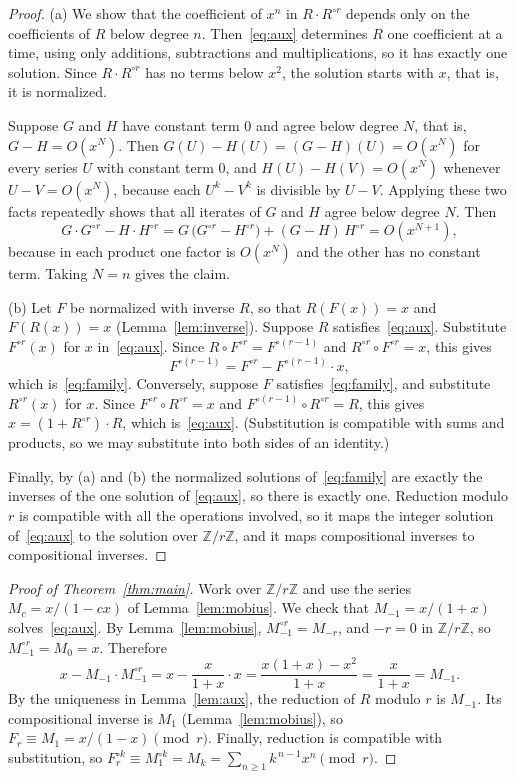 \documentclass[11pt,a4paper]{article}
\theoremstyle{definition}
\theoremstyle{remark}
\newcommand{\Z}{\mathbb{Z}}
\begin{document}
\begin{proof}
(a) We show that the coefficient of $x^n$ in $R\cdot R^{\circ r}$ depends only on the coefficients of $R$ below degree
$n$. Then~\eqref{eq:aux} determines $R$ one coefficient at a time, using only additions, subtractions and
multiplications, so it has exactly one solution. Since $R\cdot R^{\circ r}$ has no terms below $x^2$, the solution
starts with $x$, that is, it is normalized.

Suppose $G$ and $H$ have constant term $0$ and agree below degree $N$, that is, $G-H=O(x^N)$. Then
$G(U)-H(U)=(G-H)(U)=O(x^N)$ for every series $U$ with constant term $0$, and $H(U)-H(V)=O(x^N)$ whenever
$U-V=O(x^N)$, because each $U^k-V^k$ is divisible by $U-V$. Applying these two facts repeatedly shows that all
iterates of $G$ and $H$ agree below degree $N$. Then
\[
G\cdot G^{\circ r}-H\cdot H^{\circ r}=G\,\bigl(G^{\circ r}-H^{\circ r}\bigr)+(G-H)\,H^{\circ r}=O(x^{N+1}),
\]
because in each product one factor is $O(x^N)$ and the other has no constant term. Taking $N=n$ gives the claim.

(b) Let $F$ be normalized with inverse $R$, so that $R(F(x))=x$ and $F(R(x))=x$ (Lemma~\ref{lem:inverse}). Suppose $R$
satisfies~\eqref{eq:aux}. Substitute $F^{\circ r}(x)$ for $x$ in~\eqref{eq:aux}. Since $R\circ F^{\circ r}=F^{\circ(r-1)}$
and $R^{\circ r}\circ F^{\circ r}=x$, this gives
\[
F^{\circ(r-1)}=F^{\circ r}-F^{\circ(r-1)}\cdot x,
\]
which is~\eqref{eq:family}. Conversely, suppose $F$ satisfies~\eqref{eq:family}, and substitute $R^{\circ r}(x)$ for $x$.
Since $F^{\circ r}\circ R^{\circ r}=x$ and $F^{\circ(r-1)}\circ R^{\circ r}=R$, this gives $x=(1+R^{\circ r})\cdot R$,
which is~\eqref{eq:aux}. (Substitution is compatible with sums and products, so we may substitute into both sides of an
identity.)

Finally, by (a) and (b) the normalized solutions of~\eqref{eq:family} are exactly the inverses of the one solution of
\eqref{eq:aux}, so there is exactly one. Reduction modulo $r$ is compatible with all the operations involved, so it maps
the integer solution of~\eqref{eq:aux} to the solution over $\Z/r\Z$, and it maps compositional inverses to
compositional inverses.
\end{proof}

\begin{proof}[Proof of Theorem~\ref{thm:main}]
Work over $\Z/r\Z$ and use the series $M_c=x/(1-cx)$ of Lemma~\ref{lem:mobius}. We check that $M_{-1}=x/(1+x)$
solves~\eqref{eq:aux}. By Lemma~\ref{lem:mobius}, $M_{-1}^{\circ r}=M_{-r}$, and $-r=0$ in $\Z/r\Z$, so
$M_{-1}^{\circ r}=M_0=x$. Therefore
\[
x-M_{-1}\cdot M_{-1}^{\circ r}=x-\frac{x}{1+x}\cdot x=\frac{x(1+x)-x^2}{1+x}=\frac{x}{1+x}=M_{-1}.
\]
By the uniqueness in Lemma~\ref{lem:aux}, the reduction of $R$ modulo $r$ is $M_{-1}$. Its compositional inverse is
$M_1$ (Lemma~\ref{lem:mobius}), so $F_r\equiv M_1=x/(1-x)\pmod r$. Finally, reduction is compatible with substitution,
so $F_r^{\circ k}\equiv M_1^{\circ k}=M_k=\sum_{n\ge1}k^{\,n-1}x^n\pmod r$.
\end{proof}
\end{document}
